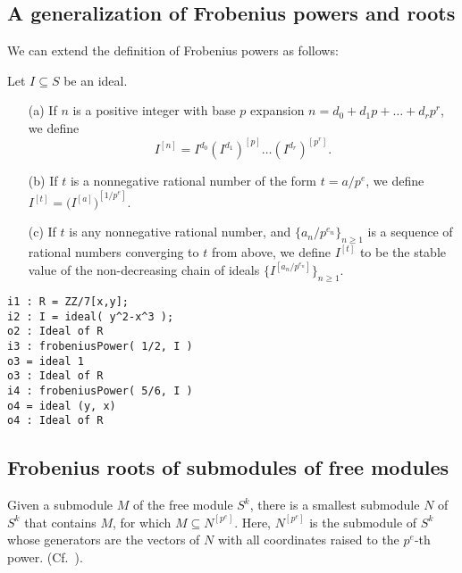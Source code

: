 \documentclass{amsart}
\begin{document}
\subsection{A generalization of Frobenius powers and roots}
We can extend the definition of Frobenius powers as follows:
\begin{definition}
Let  $I\subseteq S$ be an ideal.
\begin{enumerate}
 \item[(a)] If $n$ is a positive integer with base $p$ expansion  $n=d_0 + d_1 p +  \dots + d_r p^r$, we define
\[ I^{[n]}=I^{d_0} (I^{d_1})^{[p]} \dots  (I^{d_r})^{[p^r]}.\]
 \item[(b)] If $t$ is a nonnegative rational number of the form $t = a/p^e$, we define  $I^{[t]} = {\big(I^{[a]}\big)}^{[1/p^e]}.$
 \item[(c)] If $t$ is any nonnegative rational number, and $\{a_n/p^{e_n}\}_{n\geq 1}$ is a sequence of rational numbers converging to $t$ from above, we define $I^{[t]}$
 to be the stable value of the non-decreasing chain of ideals $\{I^{[a_n/p^{e_n}]}\}_{n\geq 1}$.
\end{enumerate}
\end{definition}


\medskip
\begin{verbatim}
i1 : R = ZZ/7[x,y];
i2 : I = ideal( y^2-x^3 );
o2 : Ideal of R
i3 : frobeniusPower( 1/2, I )
o3 = ideal 1
o3 : Ideal of R
i4 : frobeniusPower( 5/6, I )
o4 = ideal (y, x)
o4 : Ideal of R
\end{verbatim}
\medskip


\subsection{Frobenius  roots of submodules of free modules}

Given a submodule $M$ of the free module $S^k$, there is a smallest submodule $N$ of $S^k$ that contains $M$, for which $M\subseteq N^{[p^e]}$.
Here,  $N^{[p^e]}$ is the submodule  of $S^k$ whose generators are the vectors of $N$ with all coordinates raised to the $p^e$-th power. (Cf.~\cite{KatzmanZhangAlgorithm}).
\end{document}
